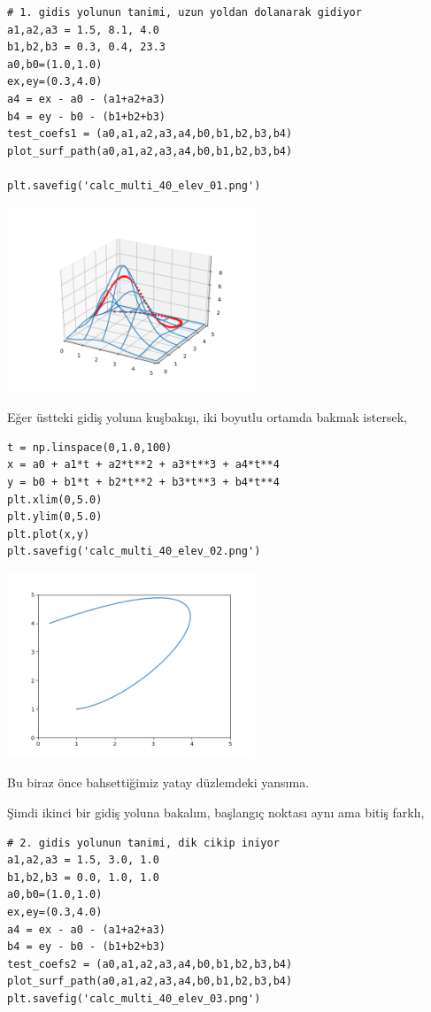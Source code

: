 \documentclass[12pt,fleqn]{article}\usepackage{../../common}
\begin{document}
\begin{verbatim}
# 1. gidis yolunun tanimi, uzun yoldan dolanarak gidiyor
a1,a2,a3 = 1.5, 8.1, 4.0
b1,b2,b3 = 0.3, 0.4, 23.3
a0,b0=(1.0,1.0)
ex,ey=(0.3,4.0)
a4 = ex - a0 - (a1+a2+a3)
b4 = ey - b0 - (b1+b2+b3)
test_coefs1 = (a0,a1,a2,a3,a4,b0,b1,b2,b3,b4)
plot_surf_path(a0,a1,a2,a3,a4,b0,b1,b2,b3,b4)

plt.savefig('calc_multi_40_elev_01.png')
\end{verbatim}


\includegraphics[width=20em]{calc_multi_40_elev_01.png}

Eğer üstteki gidiş yoluna kuşbakışı, iki boyutlu ortamda bakmak istersek,

\begin{verbatim}
t = np.linspace(0,1.0,100)
x = a0 + a1*t + a2*t**2 + a3*t**3 + a4*t**4 
y = b0 + b1*t + b2*t**2 + b3*t**3 + b4*t**4
plt.xlim(0,5.0)
plt.ylim(0,5.0)
plt.plot(x,y)
plt.savefig('calc_multi_40_elev_02.png')
\end{verbatim}

\includegraphics[width=20em]{calc_multi_40_elev_02.png}

Bu biraz önce bahsettiğimiz yatay düzlemdeki yansıma.

Şimdi ikinci bir gidiş yoluna bakalım, başlangıç noktası aynı ama bitiş farklı,

\begin{verbatim}
# 2. gidis yolunun tanimi, dik cikip iniyor
a1,a2,a3 = 1.5, 3.0, 1.0
b1,b2,b3 = 0.0, 1.0, 1.0
a0,b0=(1.0,1.0)
ex,ey=(0.3,4.0)
a4 = ex - a0 - (a1+a2+a3)
b4 = ey - b0 - (b1+b2+b3)
test_coefs2 = (a0,a1,a2,a3,a4,b0,b1,b2,b3,b4)
plot_surf_path(a0,a1,a2,a3,a4,b0,b1,b2,b3,b4)
plt.savefig('calc_multi_40_elev_03.png')
\end{verbatim}
\end{document}
